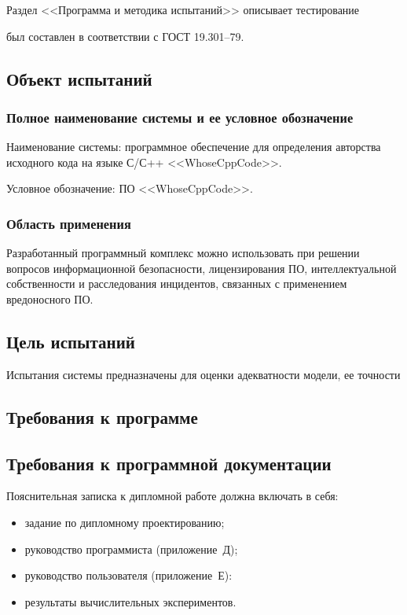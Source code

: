 Раздел <<Программа и методика испытаний>> описывает тестирование

был составлен в соответствии с ГОСТ 19.301--79.~\cite{gost_19301} 

\subsection{Объект испытаний}
\subsubsection{Полное наименование системы и ее условное обозначение}

Наименование системы: программное обеспечение для определения авторства исходного кода на 
языке С/С++ <<WhoseCppCode>>.

Условное обозначение: ПО <<WhoseCppCode>>.

\subsubsection{Область применения}

Разработанный программный комплекс можно использовать
при решении вопросов информационной безопасности, 
лицензирования ПО, интеллектуальной собственности и расследования инцидентов, 
связанных с применением вредоносного ПО.


\subsection{Цель испытаний}

Испытания системы предназначены для оценки адекватности модели, ее точности

\subsection{Требования к программе}

\subsection{Требования к программной документации}

Пояснительная записка к дипломной работе должна включать в себя:

\begin{itemize}
 \item задание по дипломному проектированию;
 \item руководство программиста (приложение~Д);
 \item руководство пользователя (приложение~Е):
 \item результаты вычислительных экспериментов.
\end{itemize}

